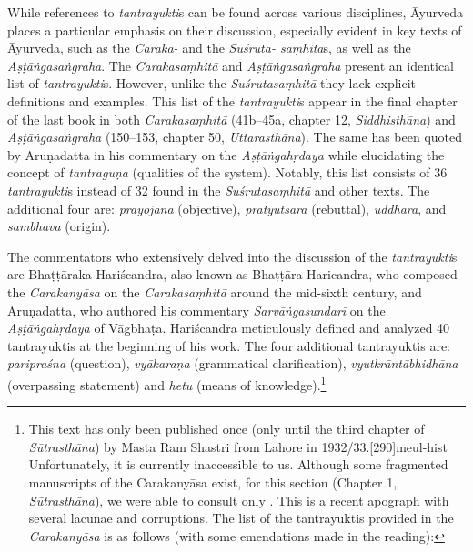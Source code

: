 While references to \emph{tantrayukti}s can be found across various disciplines, Āyurveda places a particular emphasis on their discussion, especially evident in key texts of Āyurveda, such as the \emph{Caraka-} and the \emph{Suśruta- saṃhitā}s, as well as the \emph{Aṣṭāṅgasaṅgraha}. The \emph{Carakasaṃhitā} and \emph{Aṣṭāṅgasaṅgraha} present an identical list of \emph{tantrayukti}s. However, unlike the \emph{Suśrutasaṃhitā} they lack explicit definitions and examples. This list of the \emph{tantrayukti}s appear in the final chapter of the last book in both \emph{Carakasaṃhitā} (41b--45a, chapter 12, \emph{Siddhisthāna}) and \emph{Aṣṭāṅgasaṅgraha} (150--153, chapter 50, \emph{Uttarasthāna}). The same has been quoted by Aruṇadatta in his commentary on the \emph{Aṣṭāṅgahṛdaya} while elucidating the concept of \emph{tantraguṇa} (qualities of the system). Notably, this list consists of 36 \emph{tantrayukti}s instead of 32 found in the \emph{Suśrutasaṃhitā} and other texts. The additional four are: \emph{prayojana} (objective), \emph{pratyutsāra} (rebuttal), \emph{uddhāra}, and \emph{sambhava} (origin). 

The commentators who extensively delved into the discussion of the \emph{tantrayukti}s are Bhaṭṭāraka Hariścandra, also known as Bhaṭṭāra Haricandra, who composed the \emph{Carakanyāsa} on the \emph{Carakasaṃhitā} around the mid-sixth century, and Aruṇadatta, who authored his commentary \emph{Sarvāṅgasundarī} on the \emph{Aṣṭāṅgahṛdaya} of Vāgbhaṭa. Hariścandra meticulously defined and analyzed 40 tantrayuktis at the beginning of his work. The four additional tantrayuktis are:  \emph{paripraśna} (question), \emph{vyākaraṇa} (grammatical clarification), \emph{vyutkrāntābhidhāna} (overpassing statement) and \emph{hetu} (means of knowledge).\footnote{This text has only been published once 
	(only until the third chapter of \emph{Sūtrasthāna}) by Masta Ram Shastri from Lahore in 1932/33.[290]{meul-hist} Unfortunately, it is currently inaccessible to us. Although some fragmented manuscripts of the Carakanyāsa exist, for this section (Chapter 1, \emph{Sūtrasthāna}), we were able to consult only . This is a recent apograph with several lacunae and corruptions. The list of the tantrayuktis provided in the \emph{Carakanyāsa} is as follows (with some emendations made in the reading): }

